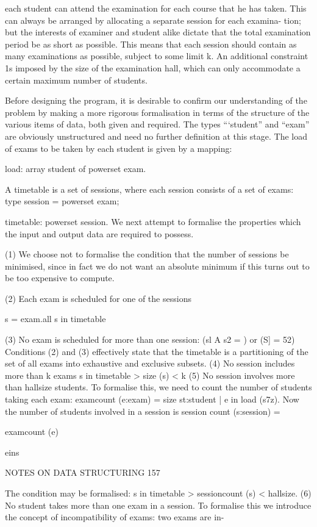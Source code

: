 {{		each student can attend the examination for each course that he has taken. This can always be arranged by allocating a separate session for each examina- tion; but the interests of examiner and student alike dictate that the total examination period be as short as possible. This means that each session should contain as many examinations as possible, subject to some limit k. An additional constraint 1s imposed by the size of the examination hall, which can only accommodate a certain maximum number of students.
		
		Before designing the program, it is desirable to confirm our understanding of the problem by making a more rigorous formalisation in terms of the structure of the various items of data, both given and required. The types “‘student” and “exam” are obviously unstructured and need no further definition at this stage. The load of exams to be taken by each student is given by a mapping:
		
		load: array student of powerset exam.
		
		A timetable is a set of sessions, where each session consists of a set of exams: type session = powerset exam;
		
		timetable: powerset session. We next attempt to formalise the properties which the input and output data are required to possess.
		
		(1) We choose not to formalise the condition that the number of sessions be minimised, since in fact we do not want an absolute minimum if this turns out to be too expensive to compute.
		
		(2) Each exam is scheduled for one of the sessions
		
		s = exam.all s in timetable
		
		(3) No exam is scheduled for more than one session: (sl A s2 ={ }) or (S] = 52) Conditions (2) and (3) effectively state that the timetable is a partitioning of the set of all exams into exhaustive and exclusive subsets. (4) No session includes more than k exams s in timetable > size (s) < k (5) No session involves more than hallsize students. To formalise this, we need to count the number of students taking each exam: examcount (e:exam) = size {st:student | e in load (s7z)}. Now the number of students involved in a session is session count (s:session) = } examcount (e)
	
	eins
	
	NOTES ON DATA STRUCTURING 157
	
	The condition may be formalised: s in timetable > sessioncount (s) < hallsize. (6) No student takes more than one exam in a session. To formalise this we introduce the concept of incompatibility of exams: two exams are in-
	
}
